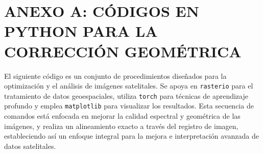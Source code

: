 \section*{ANEXO A: CÓDIGOS EN PYTHON PARA LA CORRECCIÓN GEOMÉTRICA}
{}
El siguiente código es un conjunto de procedimientos diseñados para la optimización y el análisis de imágenes satelitales. Se apoya en \texttt{rasterio} para el tratamiento de datos geoespaciales, utiliza \texttt{torch} para técnicas de aprendizaje profundo y emplea \texttt{matplotlib} para visualizar los resultados. Esta secuencia de comandos está enfocada en mejorar la calidad espectral y geométrica de las imágenes, y realiza un alineamiento exacto a través del registro de imagen, estableciendo así un enfoque integral para la mejora e interpretación avanzada de datos satelitales.

\vspace*{2mm}


	
	
